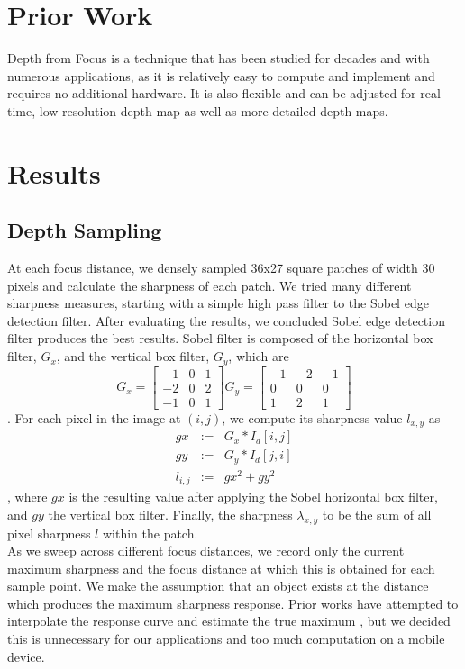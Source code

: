 \documentclass[annual, 12pt]{acmsiggraph}
\begin{document}
\section{Prior Work}

Depth from Focus is a technique that has been studied for decades \cite{Grossmann1987} \cite{pyramid} and with numerous applications, as it is relatively easy to compute and implement and requires no additional hardware.  It is also flexible and can be adjusted for real-time, low resolution depth map \cite{mobileRobot} as well as more detailed depth maps.

\section{Results}

\subsection{Depth Sampling}
At each focus distance, we densely sampled 36x27 square patches of width 30 pixels and calculate the sharpness of each patch.  We tried many different sharpness measures, starting with a simple high pass filter to the Sobel edge detection filter.  After evaluating the results, we concluded Sobel edge detection filter produces the best results. Sobel filter is composed of the horizontal box filter, $G_x$, and the vertical box filter, $G_y$, which are 
\[
G_x = \begin{bmatrix} -1 & 0 & 1 \\ -2 & 0 & 2 \\ -1 & 0 & 1 \end{bmatrix}
G_y = \begin{bmatrix} -1 & -2 & -1 \\ 0 & 0 & 0 \\ 1 & 2 & 1 \end{bmatrix}
\]. For each pixel in the image at $(i,j)$, we compute its sharpness value $l_{x,y}$ as 
\begin{eqnarray}
gx &:=& G_x * I_d[i,j] \nonumber \\
gy &:=& G_y * I_d[j,i] \nonumber \\
l_{i,j} &:=& gx^2 + gy^2 
\end{eqnarray}, where $gx$ is the resulting value after applying the Sobel horizontal box filter, and $gy$ the vertical box filter. Finally, the sharpness $\lambda_{x,y}$ to be the sum of all pixel sharpness $l$ within the patch. \\
As we sweep across different focus distances, we record only the current maximum sharpness and the focus distance at which this is obtained for each sample point. We make the assumption that an object exists at the distance which produces the maximum sharpness response.  Prior works have attempted to interpolate the response curve and estimate the true maximum \cite{Grossmann1987}, but we decided this is unnecessary for our applications and too much computation on a mobile device. 
\end{document}
